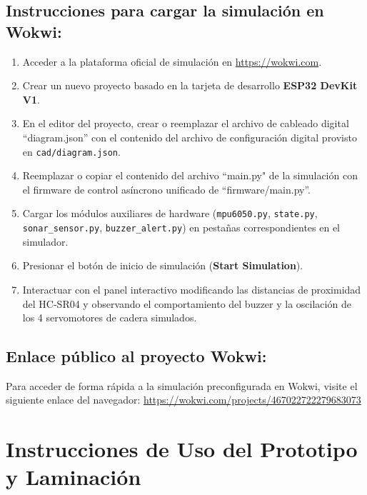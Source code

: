 \documentclass[12pt]{article}
\newcommand{\codigo}[1]{\texttt{#1}}
\begin{document}
\subsection{Instrucciones para cargar la simulación en Wokwi:}
\begin{enumerate}
    \item Acceder a la plataforma oficial de simulación en \url{https://wokwi.com}.
    \item Crear un nuevo proyecto basado en la tarjeta de desarrollo \textbf{ESP32 DevKit V1}.
    \item En el editor del proyecto, crear o reemplazar el archivo de cableado digital ``diagram.json'' con el contenido del archivo de configuración digital provisto en \codigo{cad/diagram.json}.
    \item Reemplazar o copiar el contenido del archivo ``main.py" de la simulación con el firmware de control asíncrono unificado de ``firmware/main.py''.
    \item Cargar los módulos auxiliares de hardware (\codigo{mpu6050.py}, \codigo{state.py}, \codigo{sonar\_sensor.py}, \codigo{buzzer\_alert.py}) en pestañas correspondientes en el simulador.
    \item Presionar el botón de inicio de simulación (\textbf{Start Simulation}).
    \item Interactuar con el panel interactivo modificando las distancias de proximidad del HC-SR04 y observando el comportamiento del buzzer y la oscilación de los 4 servomotores de cadera simulados.
\end{enumerate}

\subsection{Enlace público al proyecto Wokwi:}
Para acceder de forma rápida a la simulación preconfigurada en Wokwi, visite el siguiente enlace del navegador:
\url{https://wokwi.com/projects/467022722279683073}

\section{Instrucciones de Uso del Prototipo y Laminación}
\end{document}
